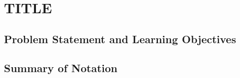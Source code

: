 %
%
%

\chapter{TITLE}

\section{Problem Statement and Learning Objectives}

\section{}
\section{}
\section{}
\section{}
\section{}
\section{}
\section{}
\section{}
\section{}


\section{Summary of Notation}


